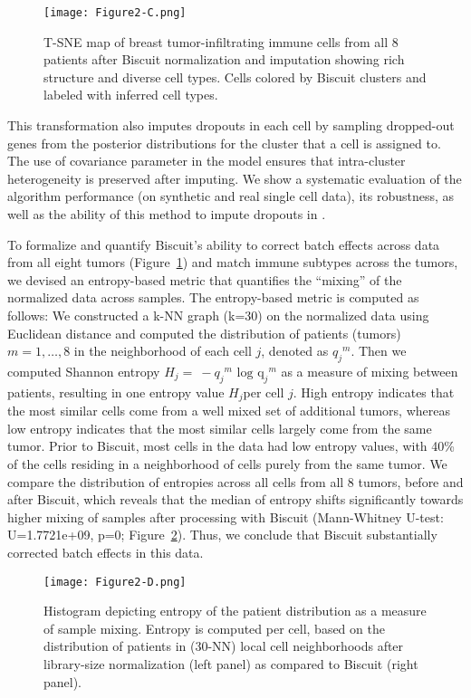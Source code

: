 \begin{figure}
\centering
\texttt{[image: Figure2-C.png]}
\caption{T-SNE map of breast tumor-infiltrating immune cells from all 8 patients after Biscuit normalization and imputation showing rich structure and diverse cell types. Cells colored by Biscuit clusters and labeled with inferred cell types.
}
\label{fig:2c}
\end{figure}

This transformation also imputes dropouts in each cell by sampling dropped-out genes from the posterior distributions for the cluster that a cell is assigned to. 
The use of covariance parameter in the model ensures that intra-cluster heterogeneity is preserved after imputing. 
We show a systematic evaluation of the algorithm performance (on synthetic and real single cell data), its robustness, as well as the ability of this method to impute dropouts in \citep{Prabhakaran2016}.

To formalize and quantify Biscuit's ability to correct batch effects across data from all eight tumors (Figure~\ref{fig:2c}) and match immune subtypes across the tumors, we devised an entropy-based metric that quantifies the ``mixing'' of the normalized data across samples. 
The entropy-based metric is computed as follows: We constructed a k-NN graph (k=30) on the normalized data using Euclidean distance and computed the distribution of patients (tumors) \(m = 1,\ldots,8\) in the neighborhood of each cell \(j\), denoted as \({q_{j}}^{m}\). 
Then we computed Shannon entropy \(H_{j} = \  - {q_{j}}^{m}\text{\ log}{\text{\ q}_{j}}^{m}\) as a measure of mixing between patients, resulting in one entropy value \(H_{j}\)per cell \(j\). 
High entropy indicates that the most similar cells come from a well mixed set of additional tumors, whereas low entropy indicates that the most similar cells largely come from the same tumor. 
Prior to Biscuit, most cells in the data had low entropy values, with 40\% of the cells residing in a neighborhood of cells purely from the same tumor.
We compare the distribution of entropies across all cells from all 8 tumors, before and after Biscuit, which reveals that the median of entropy shifts significantly towards higher mixing of samples after processing with Biscuit (Mann-Whitney U-test: U=1.7721e+09, p=0; Figure~\ref{fig:2d}). 
Thus, we conclude that Biscuit substantially corrected batch effects in this data.

\begin{figure}
\centering
\texttt{[image: Figure2-D.png]}
\caption{Histogram depicting entropy of the patient distribution as a measure of sample mixing. Entropy is computed per cell, based on the distribution of patients in (30-NN) local cell neighborhoods after library-size normalization (left panel) as compared to Biscuit (right panel).  
}
\label{fig:2d}
\end{figure}

